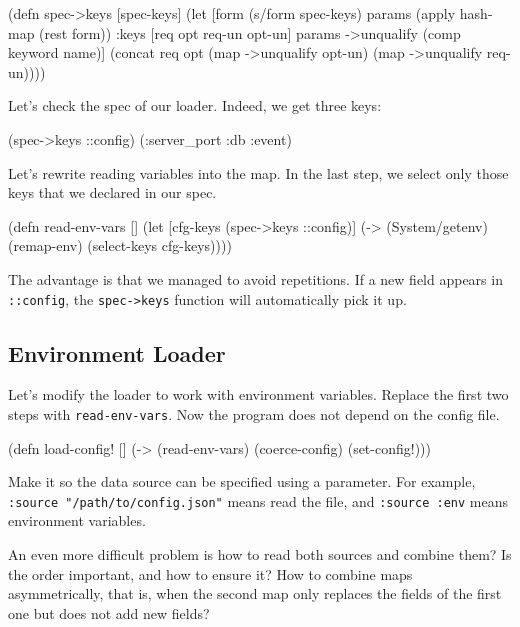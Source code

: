 \begin{clojure}
(defn spec->keys
  [spec-keys]
  (let [form (s/form spec-keys)
        params (apply hash-map (rest form))
        {:keys [req opt req-un opt-un]} params
        ->unqualify (comp keyword name)]
    (concat req
            opt
            (map ->unqualify opt-un)
            (map ->unqualify req-un))))
\end{clojure}

\fi

\noindent
Let's check the spec of our loader. Indeed, we get three keys:

\begin{clojure}
(spec->keys ::config)
(:server_port :db :event)
\end{clojure}

Let's rewrite reading variables into the map. In the last step, we select only those keys that we declared in our spec.

\begin{clojure}
(defn read-env-vars []
  (let [cfg-keys (spec->keys ::config)]
    (-> (System/getenv)
        (remap-env)
        (select-keys cfg-keys))))
\end{clojure}

The advantage is that we managed to avoid repetitions. If a new field appears in \verb|::config|, the \verb|spec->keys| function will automatically pick it up.

\subsection{Environment Loader}

Let's modify the loader to work with environment variables. Replace the first two steps with \verb|read-env-vars|. Now the program does not depend on the config file.

\begin{clojure}
(defn load-config! []
  (-> (read-env-vars)
      (coerce-config)
      (set-config!)))
\end{clojure}

Make it so the data source can be specified using a parameter. For example, \verb|:source "/path/to/config.json"| means read the file, and \verb|:source :env| means environment variables.


An even more difficult problem is how to read both sources and combine them? Is the order important, and how to ensure it? How to combine maps asymmetrically, that is, when the second map only replaces the fields of the first one but does not add new fields?

